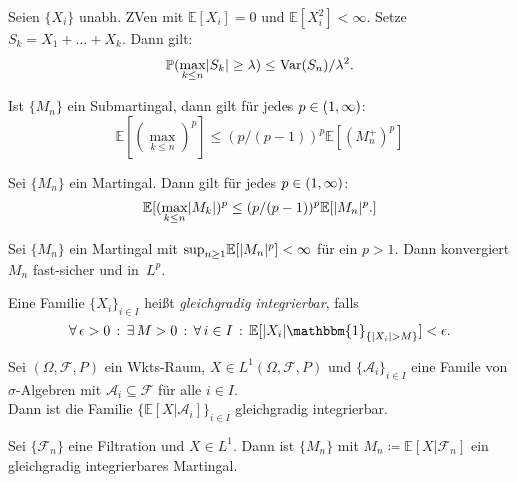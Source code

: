\documentclass{cheat-sheet}
\renewcommand{\P}{\mathbb{P}} %
\newcommand{\E}{\mathbb{E}} %
\newcommand{\ind}{\mathbbm{1}} %
\newcommand{\Alg}{\mathcal{A}} %
\newcommand{\Filt}{\mathcal{F}} %
\DeclareMathOperator{\var}{Var} %
\begin{document}
\begin{kor}
  Seien $\{ X_i \}$ unabh. ZVen mit $\E[ X_i ] = 0$ und $\E[ X_i^2 ] < \infty$.
  Setze $S_k = X_1 + \ldots + X_k$.
  Dann gilt:
  \[ \P(\max_{k \leq n} \abs{S_k} \geq \lambda) \leq \var(S_n) / \lambda^2. \]
\end{kor}

\begin{satz}
  Ist $\{ M_n \}$ ein Submartingal, dann gilt für jedes $p \in \left( 1, \infty \right)$:
  \[
    \E[ (\max_{k \leq n})^p ] \leq (p / (p-1))^p \E[ (M_n^{+})^p ]
  \]
\end{satz}

\begin{kor}
  Sei $\{ M_n \}$ ein Martingal.
  Dann gilt für jedes $p \in \left( 1, \infty \right)$:
  \[
    \E[ (\max_{k \leq n} \abs{M_k})^p \leq (p / (p-1))^p \E[ \abs{M_n}^p. ]
  \]
\end{kor}


\begin{satz}
  Sei $\{ M_n \}$ ein Martingal mit ${\sup}_{n \geq 1} \E[\abs{M_n}^p] < \infty$ für ein $p > 1$.
  Dann konvergiert $M_n$ fast-sicher und in~$L^p$.
\end{satz}


\begin{defn}
  Eine Familie $\{ X_i \}_{i \in I}$ heißt \emph{gleichgradig integrierbar}, falls
  \[
    \fa{\epsilon > 0} \ex{M > 0} \fa{i \in I} \E[ \abs{X_i} \ind_{\{ \abs{X_i} > M \}} ] < \epsilon.
  \]
\end{defn}

\begin{lem}
  Sei $(\Omega, \mathcal{F}, P)$ ein Wkts-Raum, $X \in L^1(\Omega, \mathcal{F}, P)$ und $\{ \Alg_i \}_{i \in I}$ eine Famile von $\sigma$-Algebren mit $\Alg_i \subseteq \mathcal{F}$ für alle $i \in I$. \\
  Dann ist die Familie $\{ \E[ X | \Alg_i ] \}_{i \in I}$ gleichgradig integrierbar.
\end{lem}

\begin{lem}
  Sei $\{ \Filt_n \}$ eine Filtration und $X \in L^1$.
  Dann ist $\{ M_n \}$ mit $M_n \coloneqq \E[ X | \Filt_n ]$ ein gleichgradig integrierbares Martingal.
\end{lem}
\end{document}
